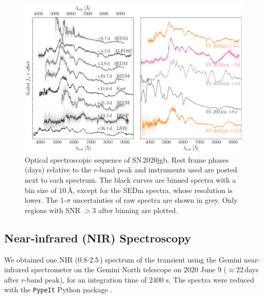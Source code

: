 \documentclass[twocolumn]{aastex631}
\newcommand\sn{SN\,2020jgb}
\begin{document}

\begin{figure}
    \centering
    \includegraphics[width=\textwidth]{optical_spec_evolution.pdf}
    \caption{Optical spectroscopic sequence of \sn. Rest frame phases (days) relative to the $r$-band peak and instruments used are posted next to each spectrum. The black curves are binned spectra with a bin size of 10\,\r{A}, except for the SEDm spectra, whose resolution is lower. The 1-$\sigma$ uncertainties of raw spectra are shown in grey. Only regions with SNR $>3$ after binning are plotted.} %
    \label{fig:spec_evo}
\end{figure}

\subsection{Near-infrared (NIR) Spectroscopy}
We obtained one NIR (0.8-2.5\,\micron) spectrum of the transient using the Gemini near-infrared spectrometer \citep[GNIRS;][]{GNIRS1998} on the Gemini North telescope on 2020 June 9 ($\approx$22\,days after $r$-band peak), for an integration time of 2400 s. The spectra were reduced with the \texttt{PypeIt} Python package \citep{pypeit:joss_pub,pypeit:zenodo}.
\end{document}
